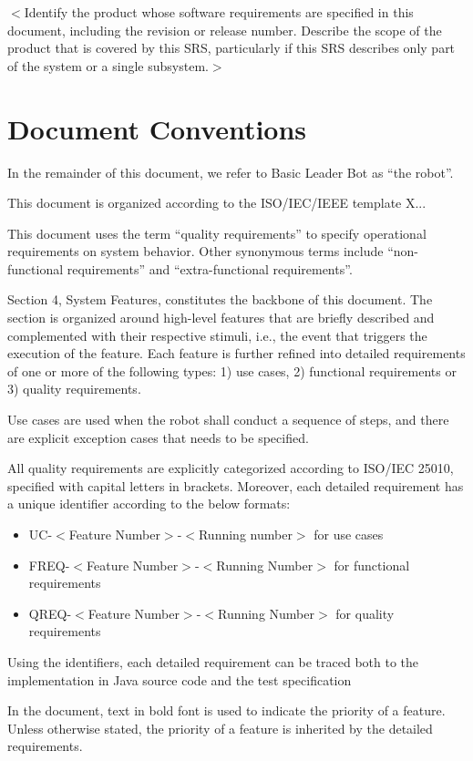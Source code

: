 \documentclass{scrreprt}
\begin{document}
$<$Identify the product whose software requirements are specified in this 
document, including the revision or release number. Describe the scope of the 
product that is covered by this SRS, particularly if this SRS describes only 
part of the system or a single subsystem.$>$

\section{Document Conventions}
In the remainder of this document, we refer to Basic Leader Bot as ``the robot''.

This document is organized according to the ISO/IEC/IEEE template X...

This document uses the term ``quality requirements'' to specify operational requirements on system behavior. Other synonymous terms include ``non-functional requirements'' and ``extra-functional requirements''.

Section 4, System Features, constitutes the backbone of this document. The section is organized around high-level features that are briefly described and complemented with their respective stimuli, i.e., the event that triggers the execution of the feature. Each feature is further refined into detailed requirements of one or more of the following types: 1) use cases, 2) functional requirements or 3) quality requirements. 

Use cases are used when the robot shall conduct a sequence of steps, and there are explicit exception cases that needs to be specified.

All quality requirements are explicitly categorized according to ISO/IEC 25010, specified with capital letters in brackets. Moreover, each detailed requirement has a unique identifier according to the below formats: 

\begin{itemize}
\item UC-$<$Feature Number$>$-$<$Running number$>$ for use cases
\item FREQ-$<$Feature Number$>$-$<$Running Number$>$ for functional requirements
\item QREQ-$<$Feature Number$>$-$<$Running Number$>$ for quality requirements
\end{itemize}

Using the identifiers, each detailed requirement can be traced both to the implementation in Java source code and the test specification

In the document, text in bold font is used to indicate the priority of a feature. Unless otherwise stated, the priority of a feature is inherited by the detailed requirements. 
\end{document}
